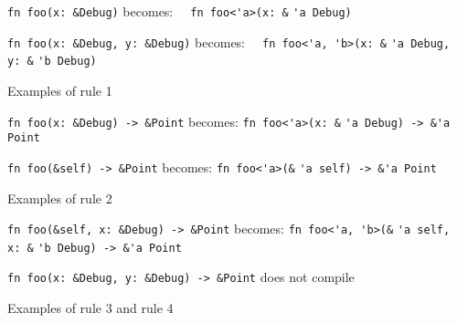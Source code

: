 \begin{fig}
{\verb|fn foo(x: &Debug)|}\newline
becomes: {\verb|  fn foo<'a>(x: &|}
{\color{red} \verb|'a|}{\verb| Debug)|}

\vspace{4mm}

{\verb|fn foo(x: &Debug, y: &Debug)|}\newline
becomes: {\verb|  fn foo<'a, 'b>(x: &|}
{\color{red} \verb|'a|}{\verb| Debug, y: &|}{\color{red} \verb|'b|}{\verb| Debug)|}

\caption{Examples of rule 1}
\label{Fig:lifetimes2}
\end{fig}

\begin{fig}
{\verb|fn foo(x: &Debug) -> &Point|}\newline
becomes: {\verb|fn foo<'a>(x: &|}
{\color{red} \verb|'a|}{\verb| Debug) -> &|}{\color{blue}\verb|'a|}{\verb| Point|}

\vspace{4mm}

{\verb|fn foo(&self) -> &Point|}\newline
becomes: {\verb|fn foo<'a>(&|}
{\color{green} \verb|'a|}{\verb| self) -> &|}{\color{blue}\verb|'a|}{\verb| Point|}

\caption{Examples of rule 2}
\label{Fig:lifetimes3}
\end{fig}

\begin{fig}
{\verb|fn foo(&self, x: &Debug) -> &Point|}\newline
becomes: {\verb|fn foo<'a, 'b>(&|}
{\color{green} \verb|'a|}{\verb| self, x: &|}{\color{red} \verb|'b|}{\verb| Debug) -> &|}{\color{blue}\verb|'a|}{\verb| Point|}


\vspace{4mm}
{\verb|fn foo(x: &Debug, y: &Debug) -> &Point|}\newline
does not compile

\caption{Examples of rule 3 and rule 4}
\label{Fig:lifetimes4}
\end{fig}

